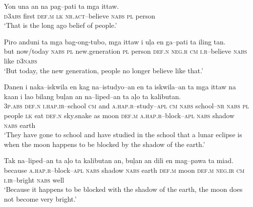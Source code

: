 \ea
\gll Yon  una  an  na  pag--pati  ta  mga  ittaw. \\
\textsc{d3abs}  first  \textsc{def.m}  \textsc{lk}  \textsc{nr.act--}believe  \textsc{nabs}  \textsc{pl}  person \\
\glt ‘That is the long ago belief of people.’
\z

\ea
\gll  Piro  anduni  ta  mga  bag-ong-tubo,\footnotemark{}  mga  ittaw  i  u\c{l}a  en   ga--pati  ta  iling  tan. \\
but  now/today  \textsc{nabs}  \textsc{pl}  new.generation  \textsc{pl}  person  \textsc{def.n}  \textsc{neg.r}  \textsc{cm}
\textsc{i.r}--believe  \textsc{nabs}  like  \textsc{d3nabs} \\
\glt ‘But today, the new generation, people no longer believe like that.’
\z

\ea
\gll Danen  i  naka--iskwila  en  kag\footnotemark{}  na--istudyo--an  en  ta   iskwila--an  ta  mga  ittaw  na  kaan  i  lao  bilang   bu\c{l}an  an  na--liped--an  ta  a\c{l}o  ta  kalibutan. \\
3\textsc{p.abs}  \textsc{def.n}  \textsc{i.hap.ir}--school  \textsc{cm}  and  \textsc{a.hap.r}--study--\textsc{apl}  \textsc{cm}  \textsc{nabs}
school--\textsc{nr}  \textsc{nabs}  \textsc{pl}  people  \textsc{lk}  eat  \textsc{def.n}  sky.snake  as moon  \textsc{def.m}  \textsc{a.hap.r}--block--\textsc{apl}  \textsc{nabs}  shadow  \textsc{nabs}  earth \\
\glt ‘They have gone to school and have studied in the school that a lunar eclipse is when the moon happens to be blocked by the shadow of the earth.’
\z

\ea
\gll Tak  na--liped--an  ta  a\c{l}o  ta  kalibutan  an,   bu\c{l}an  an  dili  en  mag--pawa  ta  miad. \\
because  \textsc{a.hap.r}--block--\textsc{apl}  \textsc{nabs}  shadow  \textsc{nabs}  earth  \textsc{def.m} moon  \textsc{def.m}  \textsc{neg.ir}  \textsc{cm}  \textsc{i.ir}--bright  \textsc{nabs}  well \\
\glt ‘Because it happens to be blocked with the shadow of the earth, the moon does not become very bright.’
\z

